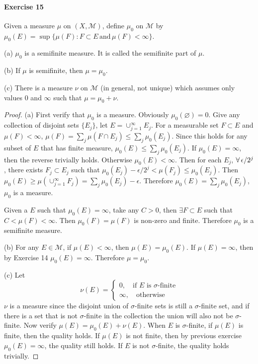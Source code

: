 \paragraph{Exercise 15}
Given a measure $\mu$ on $(X,\mathcal{M})$, define $\mu_0$ on $\mathcal{M}$ by $\mu_0(E)=\sup\{\mu(F):F\subset E\,\text{and}\,\mu(F)<\infty\}$.
\par (a) $\mu_0$ is a semifinite measure. It is called the semifinite part of $\mu$.
\par (b) If $\mu$ is semifinite, then $\mu=\mu_0$.
\par (c) There is a measure $\nu$ on $\mathcal{M}$ (in general, not unique) which assumes only values $0$ and $\infty$ such that $\mu=\mu_0+\nu$.
\begin{proof}
    (a) First verify that $\mu_0$ is a measure. Obviously $\mu_0(\varnothing)=0$. Give any collection of disjoint sets $\{E_j\}$, let $E=\cup_{j=1}^\infty E_j$. For a measurable set $F\subset E$ and $\mu(F)<\infty$, $\mu(F)=\sum_j\mu(F\cap E_j)\le\sum_j\mu_0(E_j)$. Since this holds for any subset of $E$ that has finite measure, $\mu_0(E)\le\sum_j\mu_0(E_j)$. If $\mu_0(E)=\infty$, then the reverse trivially holds. Otherwise $\mu_0(E)<\infty$. Then for each $E_j$, $\forall\, \epsilon/2^j$, there exists $F_j\subset E_j$ such that $\mu_0(E_j)-\epsilon/2^j<\mu(F_j)\le\mu_0(E_j)$. Then $\mu_0(E)\ge\mu(\cup_{j=1}^{\infty}F_j)=\sum_j\mu_0(E_j)-\epsilon$. Therefore $\mu_0(E)=\sum_j\mu_0(E_j)$, $\mu_0$ is a measure.
    
    Given a $E$ such that $\mu_0(E)=\infty$, take any $C>0$, then $\exists F\subset E$ such that $C<\mu(F)<\infty$. Then $\mu_0(F)=\mu(F)$ is non-zero and finite. Therefore $\mu_0$ is a semifinite measure.
    \par (b) For any $E\in\mathcal{M}$, if $\mu(E)<\infty$, then $\mu(E)=\mu_0(E)$. If $\mu(E)=\infty$, then by Exercise 14 $\mu_0(E)=\infty$. Therefore $\mu=\mu_0$.
    \par (c) Let 
    $$
    \nu(E)=\begin{cases}
        0,\quad\text{if $E$ is $\sigma$-finite}\\
        \infty,\quad\text{otherwise}
    \end{cases}
    $$
    $\nu$ is a measure since the disjoint union of $\sigma$-finite sets is still a $\sigma$-finite set, and if there is a set that is not $\sigma$-finite in the collection the union will also not be $\sigma$-finite. Now verify $\mu(E)=\mu_0(E)+\nu(E)$. When $E$ is $\sigma$-finite, if $\mu(E)$ is finite, then the quality holds. If $\mu(E)$ is not finite, then by previous exercise $\mu_0(E)=\infty$, the quality still holds. If $E$ is not $\sigma$-finite, the quality holds trivially.
\end{proof}
